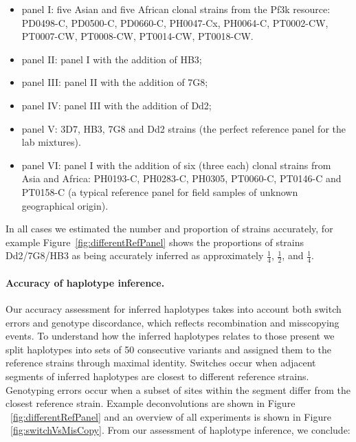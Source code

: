 \documentclass{nature}
\begin{document}
\begin{itemize}

\item panel I: five Asian and five African clonal strains from the Pf3k\cite{Pf3k2016} resource: {\textmd PD0498-C}, {\textmd PD0500-C}, {\textmd PD0660-C}, {\textmd PH0047-Cx}, {\textmd PH0064-C}, {\textmd PT0002-CW}, {\textmd PT0007-CW}, {\textmd PT0008-CW}, {\textmd PT0014-CW}, {\textmd PT0018-CW}.

\item panel II: panel I with the addition of HB3;

\item panel III: panel II with the addition of 7G8;

\item panel IV: panel III with the addition of Dd2;

\item panel V: 3D7, HB3, 7G8 and Dd2 strains (the perfect reference panel for the lab mixtures).

\item panel VI: panel I with the addition of six (three each) clonal strains from Asia and Africa: {\textmd PH0193-C}, {\textmd PH0283-C}, {\textmd PH0305}, {\textmd PT0060-C}, {\textmd PT0146-C} and {\textmd PT0158-C} (a typical reference panel for field samples of unknown geographical origin).

\end{itemize}


\noindent In all cases we estimated the number and proportion of strains accurately, for example Figure~\ref{fig:differentRefPanel} shows the proportions of strains Dd2/7G8/HB3 as being accurately inferred as approximately $\frac{1}{4}$, $\frac{1}{2}$, and $\frac{1}{4}$.



\paragraph{Accuracy of haplotype inference.}
Our accuracy assessment for inferred haplotypes takes into account both switch errors and genotype discordance, which reflects recombination and misscopying events. To understand how the inferred haplotypes relates to those present we split haplotypes into sets of 50 consecutive variants and assigned them to the reference strains through maximal identity.  Switches occur when adjacent segments of inferred haplotypes are closest to different reference strains.  Genotyping errors occur when a subset of sites within the segment differ from the closest reference strain.  Example deconvolutions are shown in Figure ~\ref{fig:differentRefPanel} and an overview of all experiments is shown in Figure ~\ref{fig:switchVsMisCopy}.  From our assessment of haplotype inference, we conclude:
\end{document}
